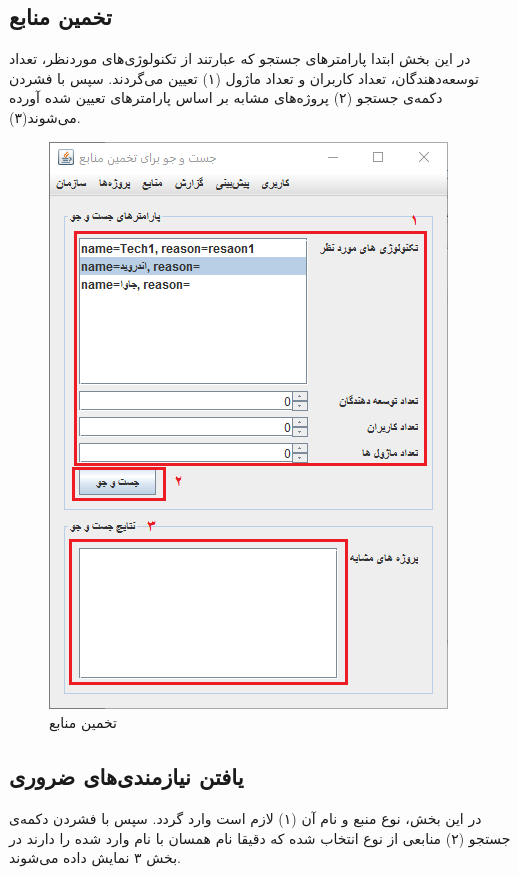 \subsection{تخمین منابع}
در این بخش ابتدا پارامترهای جستجو که عبارتند از تکنولوژی‌های موردنظر، تعداد توسعه‌دهندگان، تعداد کاربران و تعداد ماژول (۱) تعیین می‌گردند. سپس با فشردن دکمه‌ی جستجو (۲) پروژه‌های مشابه بر اساس پارامترهای تعیین شده آورده می‌شوند(۳).
	\begin{figure}[H]
		\centering
		\includegraphics[scale=0.7]{img/manual/searchRes}
		\caption{تخمین منابع}
	\end{figure}

\subsection{یافتن نیازمندی‌های ضروری}
در این بخش، نوع منبع و نام آن (۱) لازم است وارد گردد. سپس با فشردن دکمه‌ی جستجو (۲) منابعی از نوع انتخاب شده که دقیقا نام همسان با نام وارد شده را دارند در بخش ۳ نمایش داده می‌شوند. 


